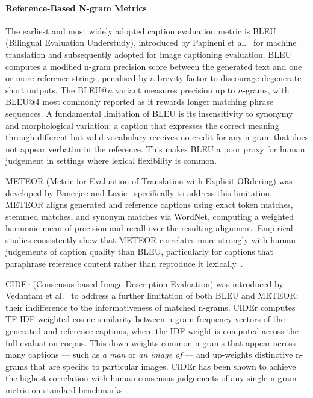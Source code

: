 \paragraph{Reference-Based N-gram Metrics}
The earliest and most widely adopted caption evaluation metric is 
BLEU (Bilingual Evaluation Understudy), introduced by Papineni et 
al.~\cite{Papineni_2002_BLEU} for machine translation and 
subsequently adopted for image captioning evaluation. BLEU computes 
a modified n-gram precision score between the generated text and 
one or more reference strings, penalised by a brevity factor to 
discourage degenerate short outputs. The BLEU@$n$ variant measures 
precision up to $n$-grams, with BLEU@4 most commonly reported as 
it rewards longer matching phrase sequences. A fundamental 
limitation of BLEU is its insensitivity to synonymy and 
morphological variation: a caption that expresses the correct 
meaning through different but valid vocabulary receives no credit 
for any n-gram that does not appear verbatim in the reference. This 
makes BLEU a poor proxy for human judgement in settings where 
lexical flexibility is common.

METEOR (Metric for Evaluation of Translation with Explicit 
ORdering) was developed by Banerjee and 
Lavie~\cite{Banerjee_2005_METEOR} specifically to address this 
limitation. METEOR aligns generated and reference captions using 
exact token matches, stemmed matches, and synonym matches via 
WordNet, computing a weighted harmonic mean of precision and recall 
over the resulting alignment. Empirical studies consistently show 
that METEOR correlates more strongly with human judgements of 
caption quality than BLEU, particularly for captions that 
paraphrase reference content rather than reproduce it 
lexically~\cite{Banerjee_2005_METEOR}.

CIDEr (Consensus-based Image Description Evaluation) was 
introduced by Vedantam et al.~\cite{Vedantam_2015_CIDEr} to 
address a further limitation of both BLEU and METEOR: their 
indifference to the informativeness of matched n-grams. CIDEr 
computes TF-IDF weighted cosine similarity between n-gram frequency 
vectors of the generated and reference captions, where the IDF 
weight is computed across the full evaluation corpus. This down-weights 
common n-grams that appear across many captions --- such as 
\textit{a man} or \textit{an image of} --- and up-weights 
distinctive n-grams that are specific to particular images. CIDEr 
has been shown to achieve the highest correlation with human 
consensus judgements of any single n-gram metric on standard 
benchmarks~\cite{Vedantam_2015_CIDEr}.

